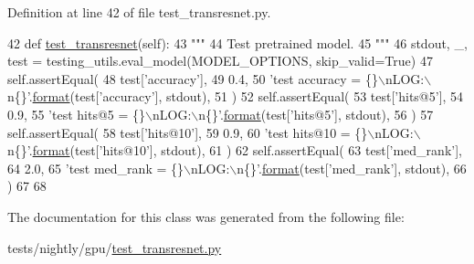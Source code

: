 Definition at line 42 of file test\+\_\+transresnet.\+py.


\begin{DoxyCode}
42     \textcolor{keyword}{def }\hyperlink{namespacetest__transresnet}{test\_transresnet}(self):
43         \textcolor{stringliteral}{"""}
44 \textcolor{stringliteral}{        Test pretrained model.}
45 \textcolor{stringliteral}{        """}
46         stdout, \_, test = testing\_utils.eval\_model(MODEL\_OPTIONS, skip\_valid=\textcolor{keyword}{True})
47         self.assertEqual(
48             test[\textcolor{stringliteral}{'accuracy'}],
49             0.4,
50             \textcolor{stringliteral}{'test accuracy = \{\}\(\backslash\)nLOG:\(\backslash\)n\{\}'}.\hyperlink{namespaceparlai_1_1chat__service_1_1services_1_1messenger_1_1shared__utils_a32e2e2022b824fbaf80c747160b52a76}{format}(test[\textcolor{stringliteral}{'accuracy'}], stdout),
51         )
52         self.assertEqual(
53             test[\textcolor{stringliteral}{'hits@5'}],
54             0.9,
55             \textcolor{stringliteral}{'test hits@5 = \{\}\(\backslash\)nLOG:\(\backslash\)n\{\}'}.\hyperlink{namespaceparlai_1_1chat__service_1_1services_1_1messenger_1_1shared__utils_a32e2e2022b824fbaf80c747160b52a76}{format}(test[\textcolor{stringliteral}{'hits@5'}], stdout),
56         )
57         self.assertEqual(
58             test[\textcolor{stringliteral}{'hits@10'}],
59             0.9,
60             \textcolor{stringliteral}{'test hits@10 = \{\}\(\backslash\)nLOG:\(\backslash\)n\{\}'}.\hyperlink{namespaceparlai_1_1chat__service_1_1services_1_1messenger_1_1shared__utils_a32e2e2022b824fbaf80c747160b52a76}{format}(test[\textcolor{stringliteral}{'hits@10'}], stdout),
61         )
62         self.assertEqual(
63             test[\textcolor{stringliteral}{'med\_rank'}],
64             2.0,
65             \textcolor{stringliteral}{'test med\_rank = \{\}\(\backslash\)nLOG:\(\backslash\)n\{\}'}.\hyperlink{namespaceparlai_1_1chat__service_1_1services_1_1messenger_1_1shared__utils_a32e2e2022b824fbaf80c747160b52a76}{format}(test[\textcolor{stringliteral}{'med\_rank'}], stdout),
66         )
67 
68 
\end{DoxyCode}


The documentation for this class was generated from the following file\+:\begin{DoxyCompactItemize}
\item 
tests/nightly/gpu/\hyperlink{test__transresnet_8py}{test\+\_\+transresnet.\+py}\end{DoxyCompactItemize}
